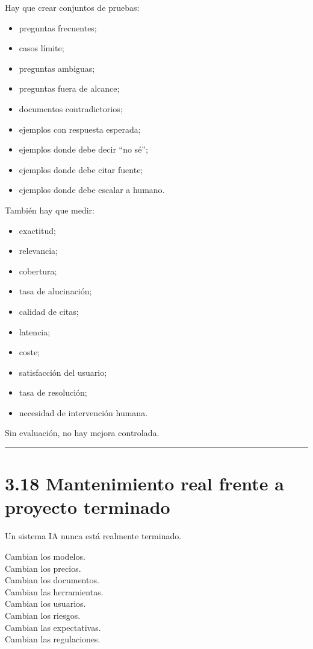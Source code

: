 Hay que crear conjuntos de pruebas:

\begin{itemize}
\tightlist
\item
  preguntas frecuentes;
\item
  casos límite;
\item
  preguntas ambiguas;
\item
  preguntas fuera de alcance;
\item
  documentos contradictorios;
\item
  ejemplos con respuesta esperada;
\item
  ejemplos donde debe decir ``no sé'';
\item
  ejemplos donde debe citar fuente;
\item
  ejemplos donde debe escalar a humano.
\end{itemize}

También hay que medir:

\begin{itemize}
\tightlist
\item
  exactitud;
\item
  relevancia;
\item
  cobertura;
\item
  tasa de alucinación;
\item
  calidad de citas;
\item
  latencia;
\item
  coste;
\item
  satisfacción del usuario;
\item
  tasa de resolución;
\item
  necesidad de intervención humana.
\end{itemize}

Sin evaluación, no hay mejora controlada.

\begin{center}\rule{0.5\linewidth}{0.5pt}\end{center}

\section{3.18 Mantenimiento real frente a proyecto
terminado}\label{mantenimiento-real-frente-a-proyecto-terminado}

Un sistema IA nunca está realmente terminado.

Cambian los modelos.\\
Cambian los precios.\\
Cambian los documentos.\\
Cambian las herramientas.\\
Cambian los usuarios.\\
Cambian los riesgos.\\
Cambian las expectativas.\\
Cambian las regulaciones.

